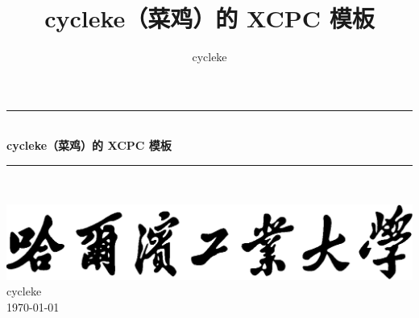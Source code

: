 \documentclass[twoside]{article}
\title{cycleke（菜鸡）的 XCPC 模板}
\author{cycleke}
\newcommand{\HRule}{\rule{\linewidth}{0.5mm}}
\begin{document}
\begin{titlepage}
  \begin{center}
    \HRule{} \\ [1cm]
    \textbf{\Huge{cycleke（菜鸡）的 XCPC 模板}} \\ [0.5cm]
    \HRule{} \\ [4cm]

    \vfill
    \begin{figure}[H]
      \centering
       \quad
    \end{figure}
    \includegraphics[width=.55\linewidth]{school} \\ [2cm]
    \LARGE{cycleke} \\ [1cm]
    \Large{\today}
  \end{center}
  \clearpage
\end{titlepage}

\tableofcontents\clearpage
\pagestyle{fancy}
\lfoot{}
\cfoot{\thepage}\rfoot{}
\setcounter{page}{1}
\clearpage


% 
% 
% 
% 
% 
% 
% 
\end{document}
